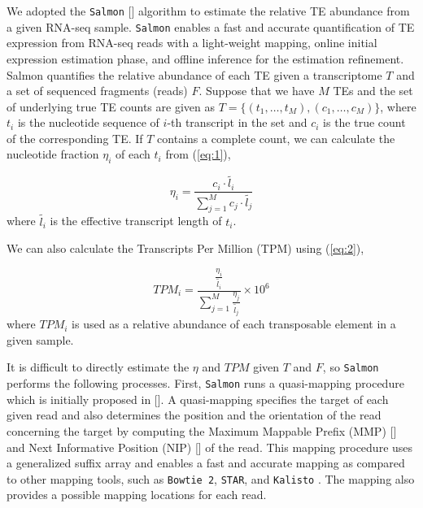 \documentclass[wsdraft]{ws-procs11x85}
\begin{document}
We adopted the \texttt{Salmon} [] algorithm to estimate the relative TE abundance from a given RNA-seq sample. \texttt{Salmon} enables a fast and accurate quantification of TE expression from RNA-seq reads with a light-weight mapping, online initial expression estimation phase, and offline inference for the estimation refinement.\cite{patro2017salmon,srivastava2016rapmap,bishop2006pattern,foulds2013stochastic} 
Salmon quantifies the relative abundance of each TE  given a transcriptome $T$ and a set of sequenced fragments (reads) $F$.
Suppose that we have $M$ TEs and the set of underlying true TE counts are given as $T = \{(t_1, \dots , t_M), (c_1, \dots, c_M) \}$, where $t_i$ is the nucleotide sequence of $i$-th transcript in the set and $c_i$ is the true count of the corresponding TE. If $T$ contains a complete count, we can calculate the nucleotide fraction $\eta_i$ of each $t_i$ from (\ref{eq:1}),

\begin{equation} \label{eq:1}
\eta_i = \frac{c_i \cdot \widetilde{l_i} }{\sum_{j=1}^{M} c_j \cdot \widetilde{l_j}}
\end{equation}
where $\widetilde{l_i}$ is the effective transcript length of $t_i$\cite{li2009rna}.

We can also calculate the Transcripts Per Million (TPM) using (\ref{eq:2}),

\begin{equation} \label{eq:2}
TPM_i = \frac{ \frac{\eta_i }{\widetilde{l_i}} }
{\sum_{j=1}^{M} \frac{\eta_j }{\widetilde{l_j}} }\times 10^6
\end{equation}
where $TPM_i$ is used as a relative abundance of each transposable element in a given sample. 

It is difficult to directly estimate the $\eta$ and $TPM$ given $T$ and $F$, so \texttt{Salmon} performs the following processes. First,
\texttt{Salmon} runs a quasi-mapping procedure which is initially proposed in []. A quasi-mapping specifies the target of each given read and also determines the position and the orientation of the read concerning the target by computing the
Maximum Mappable Prefix (MMP) [] and Next Informative Position (NIP) [] of the read.
This mapping procedure uses a generalized suffix array \cite{manber1993suffix} and enables a fast and accurate mapping as compared to other mapping tools, such as \texttt{Bowtie 2}, \texttt{STAR}, and \texttt{Kalisto} \cite{srivastava2016rapmap}. The mapping also provides a possible mapping locations for each read.
\end{document}
